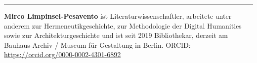 \begin{center}\rule{0.5\linewidth}{0.5pt}\end{center}

\textbf{Mirco Limpinsel-Pesavento} ist Literaturwissenschaftler,
arbeitete unter anderem zur Hermeneutikgeschichte, zur Methodologie der
Digital Humanities sowie zur Architekturgeschichte und ist seit 2019
Bibliothekar, derzeit am Bauhaus-Archiv / Museum für Gestaltung in
Berlin. ORCID: \url{https://orcid.org/0000-0002-4301-6892}

